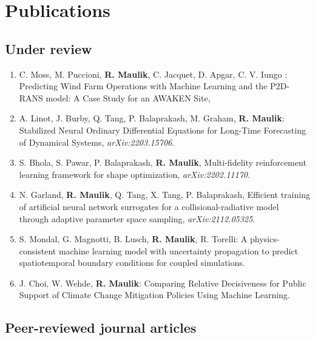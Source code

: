 \documentclass[letterpaper]{article}
\begin{document}
\section*{Publications}

\subsection*{Under review}

\begin{enumerate}

\item C. Moss, M. Puccioni, \textbf{R. Maulik}, C. Jacquet, D. Apgar, C. V. Iungo : Predicting Wind Farm Operations with Machine Learning and the P2D-RANS model: A Case Study for an AWAKEN Site, 

\item A. Linot, J. Burby, Q. Tang, P. Balaprakash, M. Graham, \textbf{R. Maulik}: Stabilized Neural Ordinary Differential Equations for Long-Time Forecasting of Dynamical Systems, {\it arXiv:2203.15706}.

\item S. Bhola, S. Pawar, P. Balaprakash, \textbf{R. Maulik}, Multi-fidelity reinforcement learning framework for shape optimization, {\it arXiv:2202.11170}.

\item N. Garland, \textbf{R. Maulik}, Q. Tang, X. Tang, P. Balaprakash, Efficient training of artificial neural network surrogates for a collisional-radiative model through adaptive parameter space sampling, {\it arXiv:2112.05325}.

\item S. Mondal, G. Magnotti, B. Lusch, \textbf{R. Maulik}, R. Torelli: A physics-consistent machine learning model with uncertainty propagation to predict spatiotemporal boundary conditions for coupled simulations.

\item J. Choi, W. Wehde, \textbf{R. Maulik}: Comparing Relative Decisiveness for Public Support of Climate Change Mitigation Policies Using Machine Learning.

\end{enumerate}


\subsection*{Peer-reviewed journal articles}
\end{document}
